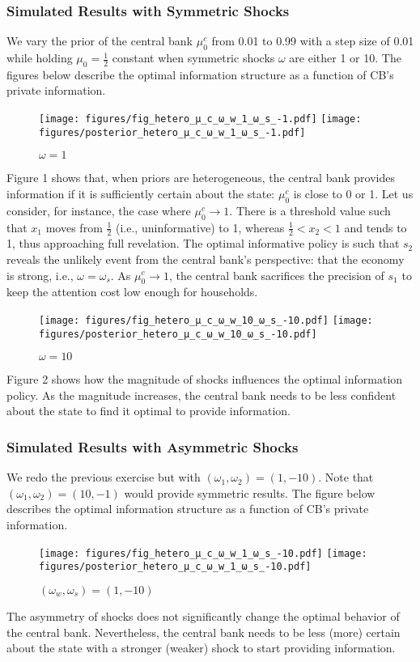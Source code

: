 \documentclass[12pt,a4paper]{article}
\begin{document}
\subsubsection{Simulated Results with Symmetric Shocks}
We vary the prior of the central bank $\mu_0^c$ from 0.01 to 0.99 with a step size of 0.01 while holding $\mu_0=\frac{1}{2}$ constant when symmetric shocks $\omega$ are either 1 or 10. The figures below describe the optimal information structure as a function of CB's private information.
\begin{figure}[htp!]
\caption{$\omega=1$}
\centering
\texttt{[image: figures/fig\_hetero\_μ\_c\_ω\_w\_1\_ω\_s\_-1.pdf]}
\texttt{[image: figures/posterior\_hetero\_μ\_c\_ω\_w\_1\_ω\_s\_-1.pdf]}
\end{figure}
Figure 1 shows that, when priors are heterogeneous, the central bank provides information if it is sufficiently certain about the state: $\mu_0^c$ is close to 0 or 1. Let us consider, for instance, the case where $\mu_0^c \to 1$. There is a threshold value such that $x_1$ moves from $\frac{1}{2}$ (i.e., uninformative) to 1, whereas $\frac{1}{2}<x_2<1$ and tends to 1, thus approaching full revelation. The optimal informative policy is such that $s_2$ reveals the unlikely event from the central bank's perspective: that the economy is strong, i.e., $\omega=\omega_s$. As $\mu_0^c \to 1$, the central bank sacrifices the precision of $s_1$ to keep the attention cost low enough for households.
\begin{figure}[htp!]
\caption{$\omega=10$}
\centering
\texttt{[image: figures/fig\_hetero\_μ\_c\_ω\_w\_10\_ω\_s\_-10.pdf]}
\texttt{[image: figures/posterior\_hetero\_μ\_c\_ω\_w\_10\_ω\_s\_-10.pdf]}
\end{figure}
Figure 2 shows how the magnitude of shocks influences the optimal information policy. As the magnitude increases, the central bank needs to be less confident about the state to find it optimal to provide information.

\subsubsection{Simulated Results with Asymmetric Shocks}
We redo the previous exercise but with $(\omega_1,\omega_2)= (1, -10)$. Note that $(\omega_1,\omega_2)= (10, -1)$ would provide symmetric results. The figure below describes the optimal information structure as a function of CB's private information.
\begin{figure}[htp!]
\caption{$(\omega_w,\omega_s)=(1, -10)$}
\centering
\texttt{[image: figures/fig\_hetero\_μ\_c\_ω\_w\_1\_ω\_s\_-10.pdf]}
\texttt{[image: figures/posterior\_hetero\_μ\_c\_ω\_w\_1\_ω\_s\_-10.pdf]}
\end{figure}
The asymmetry of shocks does not significantly change the optimal behavior of the central bank. Nevertheless, the central bank needs to be less (more) certain about the state with a stronger (weaker) shock to start providing information.
\end{document}
